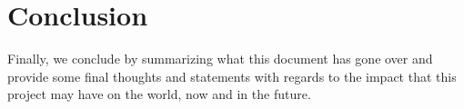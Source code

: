 \documentclass[12pt]{article}
\newcommand{\sentence}{} %
\begin{document}
    \pagebreak


    \section{Conclusion}\label{sec:conclusion}

    \tab
    Finally, we conclude by summarizing what this document has gone over and provide some final thoughts and
    statements with regards to the impact that this project may have on the world, now and in the future.
    \sentence


    \pagebreak


    \printbibliography[heading=bibintoc,title={References}]

    \pagebreak
\end{document}
